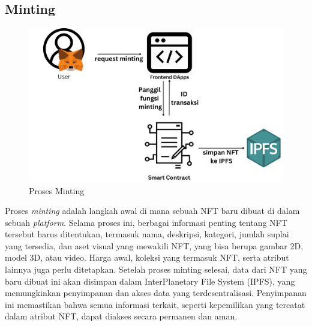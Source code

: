 \subsection{Minting}
\begin{figure} [H] \centering
  \includegraphics[scale=0.25]{gambar/proses_minting.png}
  \caption{Proses Minting}
  \label{fig:prosesminting}
\end{figure}

Proses \emph{minting} adalah langkah awal di mana sebuah NFT baru dibuat di dalam sebuah \emph{platform}. Selama proses ini, berbagai informasi penting tentang NFT tersebut harus ditentukan, termasuk nama, deskripsi, kategori, jumlah suplai yang tersedia, dan aset visual yang mewakili NFT, yang bisa berupa gambar 2D, model 3D, atau video. Harga awal, koleksi yang termasuk NFT, serta atribut lainnya juga perlu ditetapkan. Setelah proses minting selesai, data dari NFT yang baru dibuat ini akan disimpan dalam InterPlanetary File System (IPFS), yang memungkinkan penyimpanan dan akses data yang terdesentralisasi. Penyimpanan ini memastikan bahwa semua informasi terkait, seperti kepemilikan yang tercatat dalam atribut NFT, dapat diakses secara permanen dan aman.
\vspace{0.5 cm}

